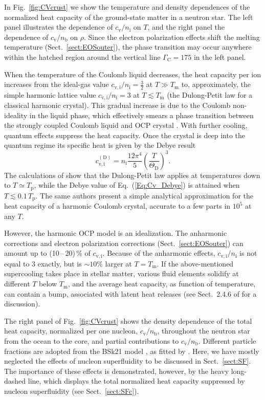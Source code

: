 \documentclass[smallextended]{svjour3}       %
\newcommand{\beq}{\begin{equation}}
\newcommand{\eeq}{\end{equation}}
\newcommand{\fig}[1]{Fig.~\ref{#1}}
\newcommand{\Gami}{\Gamma_{\mathrm{C}}}
\newcommand{\nb}{n_\mathrm{b}}
\newcommand{\nion}{n_\mathrm{i}}
\newcommand{\req}[1]{Eq.~(\ref{#1})}
\newcommand{\Tp}{T_\mathrm{p}}
\newcommand{\Tm}{T_\mathrm{m}}
\begin{document}
In \fig{fig:CVcrust} we show the temperature and density
dependences of the normalized heat capacity of the
ground-state matter in a neutron star. The left panel
illustrates the dependence of $c_\mathrm{v}/n_\mathrm{i}$ on
$T$, and the right panel the dependence of
$c_\mathrm{v}/n_\mathrm{b}$ on $\rho$. Since the electron
polarization effects shift the melting temperature
(Sect.~\ref{sect:EOSouter}), the phase transition may occur
anywhere within the hatched region around the vertical line
$\Gami=175$ in the left panel.

When the temperature of the Coulomb liquid
decreases, the heat capacity per ion increases from the ideal-gas
value $c_\mathrm{v,i}/\nion=\frac32$ at $T\gg\Tm$ to,
approximately, the simple harmonic lattice value
$c_\mathrm{v,i}/\nion=3$ at $T\lesssim\Tm$ (the Dulong-Petit
law for a classical harmonic crystal). This gradual increase
is due to the
Coulomb non-ideality in the liquid phase, which effectively
smears a phase transition between the strongly coupled
Coulomb liquid and OCP crystal \citep[see][]{Baiko-ea98}.
With further cooling, quantum effects suppress the heat
capacity. Once the crystal is deep into the quantum regime
its specific heat is given by the Debye result
\beq
c_\mathrm{v,i}^\mathrm{(D)} =
\nion \frac{12 \pi^4}{5} \left(\frac{T}{\Theta_\mathrm{D}}
\right)^3.
\label{Eq:Cv_Debye}
\eeq
The calculations of \citet{BPY01}
show that the Dulong-Petit law applies at temperatures down
to $T \simeq \Tp$, while the Debye value of
\req{Eq:Cv_Debye} is attained when $T \lesssim 0.1\,\Tp$.
The same authors present a simple analytical approximation
for the heat capacity of a harmonic Coulomb crystal,
accurate to a few parts in $10^5$ at any $T$.

However, the harmonic OCP model is an idealization. The
anharmonic corrections and electron polarization corrections
(Sect.~\ref{sect:EOSouter}) can amount up to
(10\,--\,20)\,\% of $c_\mathrm{v,i}$. Because of the
anharmonic effects, $c_\mathrm{v,i}/\nion$ is not equal to 3
exactly, but is $\sim10$\% larger at $T=\Tm$. If the
above-mentioned supercooling takes place in stellar matter,
various fluid elements solidify at different $T$ below
$\Tm$, and the average heat capacity, as function of
temperature, can contain a bump, associated with latent heat
releases (see Sect.~2.4.6 of \citealp{HPY07} for a
discussion).

The right panel of \fig{fig:CVcrust} shows the density
dependence of the total heat capacity, normalized per one
nucleon, $c_\mathrm{v}/\nb$, throughout the neutron star
from the ocean to the core, and partial contributions to 
$c_\mathrm{v}/\nb$. Different particle fractions are adopted
from the BSk21 model \citep{Goriely-ea10,PearsonGC11,Pearson-ea12}, as
fitted by \citet{Potekhin-ea13}. Here, we have mostly
neglected the effects of nucleon superfluidity to be
discussed in Sect.~\ref{sect:SF}. The importance of these
effects is demonstrated, however, by the heavy long-dashed
line, which displays the total normalized heat capacity
suppressed by nucleon superfluidity (see
Sect.~\ref{sect:SFc}).
\end{document}
